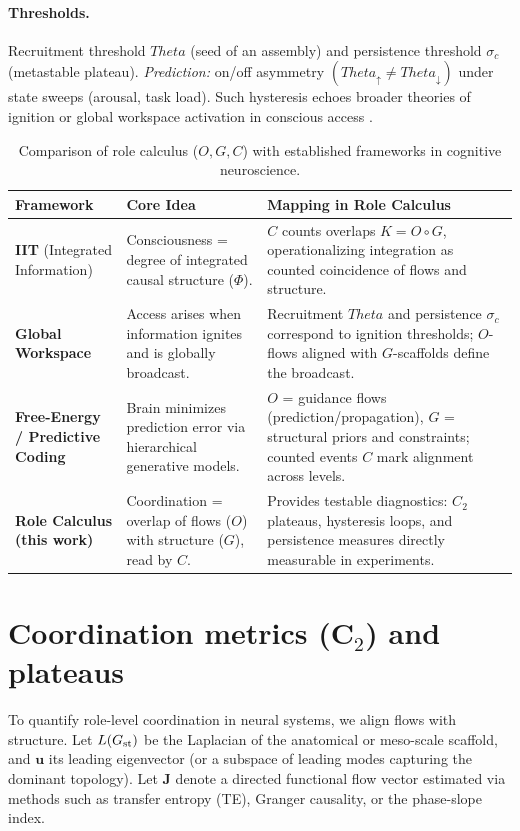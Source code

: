 \documentclass[12pt,a4paper,oneside]{scrreprt}
\def\Theta{Theta}%
\begin{document}
\paragraph{Thresholds.}
Recruitment threshold $\Theta$ (seed of an assembly) and persistence threshold $\sigma_c$ (metastable plateau). 
\emph{Prediction:} on/off asymmetry $(\Theta_\uparrow\neq\Theta_\downarrow)$ under state sweeps (arousal, task load). Such hysteresis echoes broader theories of ignition or global workspace activation in conscious access \cite{dehaene2011,chalmers1995}.  

\begin{table}[h]
\centering
\caption{Comparison of role calculus ($O,G,C$) with established frameworks in cognitive neuroscience.}
\begin{tabular}{p{3cm} p{5cm} p{6cm}}
\toprule
\textbf{Framework} & \textbf{Core Idea} & \textbf{Mapping in Role Calculus} \\
\midrule
\textbf{IIT} (Integrated Information) \cite{tononi2008} & Consciousness = degree of integrated causal structure ($\Phi$). & $C$ counts overlaps $K=O\!\circ G$, operationalizing integration as counted coincidence of flows and structure. \\
\textbf{Global Workspace} \cite{dehaene2011} & Access arises when information ignites and is globally broadcast. & Recruitment $\Theta$ and persistence $\sigma_c$ correspond to ignition thresholds; $O$-flows aligned with $G$-scaffolds define the broadcast. \\
\textbf{Free-Energy / Predictive Coding} \cite{friston2016} & Brain minimizes prediction error via hierarchical generative models. & $O$ = guidance flows (prediction/propagation), $G$ = structural priors and constraints; counted events $C$ mark alignment across levels. \\
\textbf{Role Calculus (this work)} & Coordination = overlap of flows ($O$) with structure ($G$), read by $C$. & Provides testable diagnostics: $C_2$ plateaus, hysteresis loops, and persistence measures directly measurable in experiments. \\
\bottomrule
\end{tabular}
\end{table}

\section{Coordination metrics (C$_2$) and plateaus}\label{sec:human-C2}
To quantify role-level coordination in neural systems, we align flows with structure.  
Let $L(G_{\rm st})$ be the Laplacian of the anatomical or meso-scale scaffold, and $\mathbf u$ its leading eigenvector (or a subspace of leading modes capturing the dominant topology).  
Let $\mathbf J$ denote a directed functional flow vector estimated via methods such as transfer entropy (TE), Granger causality, or the phase-slope index.  
\end{document}
